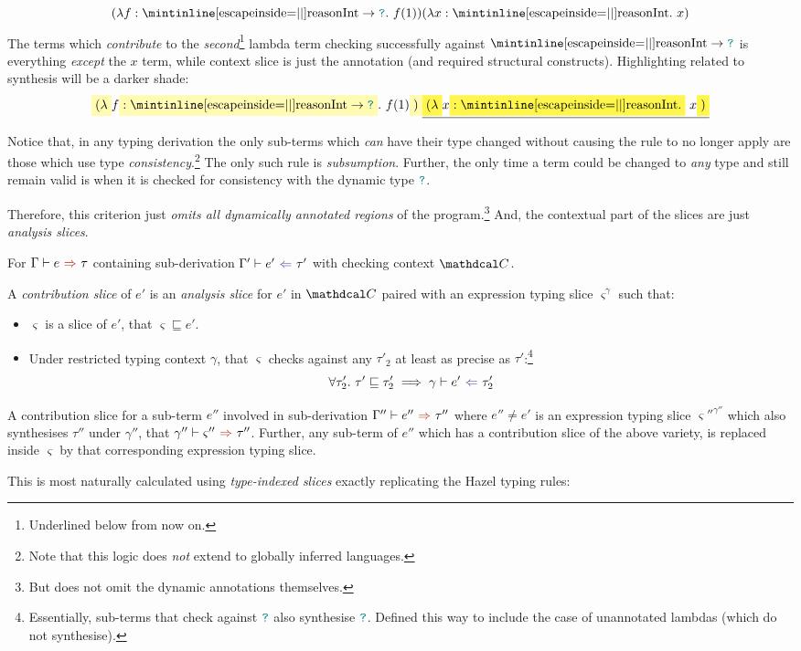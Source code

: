\[(\lambda f: \code{Int} \to \dyn.\ f(1))(\lambda x : \code{Int}.\ x)\]
The terms which \textit{contribute} to the \textit{second}\footnote{Underlined below from now on.} lambda term checking successfully against $\code{Int} \to \dyn$ is everything \textit{except} the $x$ term, while context slice is just the annotation (and required structural constructs). Highlighting related to synthesis will be a darker shade:
\[\hlcmaths[yellow!30]{(\lambda} f\hlcmaths[yellow!30]{: \code{Int} \to \dyn}.\ f(1)\hlcmaths[yellow!30]{)}\underline{\hlcmaths[yellow!70]{(\lambda} x \hlcmaths[yellow!70]{: \code{Int}.}\ x\hlcmaths[yellow!70]{)}}\]

Notice that, in any typing derivation the only sub-terms which \textit{can} have their type changed without causing the rule to no longer apply are those which use type \textit{consistency}.\footnote{Note that this logic does \textit{not} extend to globally inferred languages.} The only such rule is \textit{subsumption}. Further, the only time a term could be changed to \textit{any} type and still remain valid is when it is checked for consistency with the dynamic type ${\color{teal}\texttt{?}}$.

Therefore, this criterion just \textit{omits all dynamically annotated regions} of the program.\footnote{But does not omit the dynamic annotations themselves.} And, the contextual part of the slices are just \textit{analysis slices}.

\begin{definition}\label{def:ContributionSlice}
For $\synthesis{e}{\tau}$ containing sub-derivation $\analysis[\Gamma']{e'}{\tau'}$ with checking context $\C$.

A \textit{contribution slice} of $e'$ is an \textit{analysis slice} for $e'$ in $\C$ paired with an expression typing slice $\varsigma^\gamma$ such that:
\begin{itemize}
\item $\varsigma$ is a slice of $e'$, that $\varsigma \sqsubseteq e'$.
\item Under restricted typing context $\gamma$, that $\varsigma$ checks against any $\tau'_2$ at least as precise as $\tau'$:\footnote{Essentially, sub-terms that check against ${\color{teal}\texttt{?}}$ also synthesise ${\color{teal}\texttt{?}}$. Defined this way to include the case of unannotated lambdas (which do not synthesise).}
\[\forall \tau'_2.\ \tau' \sqsubseteq \tau'_2 \implies \analysis[\gamma]{e'}{\tau'_2}\]
\end{itemize}
A contribution slice for a sub-term $e''$ involved in sub-derivation $\synthesis[\Gamma'']{e''}{\tau''}$ where $e'' \neq e'$ is an expression typing slice $\varsigma''^{\gamma''}$ which also synthesises $\tau''$ under $\gamma''$, that $\synthesis[\gamma'']{\varsigma''}{\tau''}$. Further, any sub-term of $e''$ which has a contribution slice of the above variety, is replaced inside $\varsigma$ by that corresponding expression typing slice.
\end{definition} 
This is most naturally calculated using \textit{type-indexed slices} exactly replicating the Hazel typing rules:

